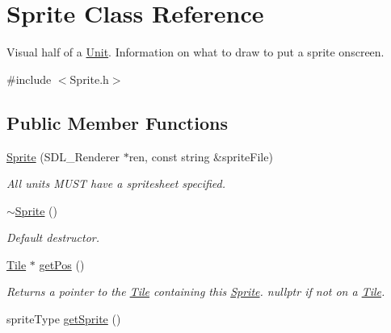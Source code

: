 \hypertarget{class_sprite}{}\section{Sprite Class Reference}
\label{class_sprite}


Visual half of a \hyperlink{class_unit}{Unit}. Information on what to draw to put a sprite onscreen.  




{\ttfamily \#include $<$Sprite.\+h$>$}

\subsection*{Public Member Functions}
\begin{DoxyCompactItemize}
\item 
\hyperlink{class_sprite_aae9fc5691e7263139e9e8d1d969cba5c}{Sprite} (S\+D\+L\+\_\+\+Renderer $\ast$ren, const string \&sprite\+File)\hypertarget{class_sprite_aae9fc5691e7263139e9e8d1d969cba5c}{}\label{class_sprite_aae9fc5691e7263139e9e8d1d969cba5c}

\begin{DoxyCompactList}\small\item\em All units M\+U\+ST have a spritesheet specified. \end{DoxyCompactList}\item 
\hyperlink{class_sprite_a8accab430f9d90ae5117b57d67e32b84}{$\sim$\+Sprite} ()\hypertarget{class_sprite_a8accab430f9d90ae5117b57d67e32b84}{}\label{class_sprite_a8accab430f9d90ae5117b57d67e32b84}

\begin{DoxyCompactList}\small\item\em Default destructor. \end{DoxyCompactList}\item 
\hyperlink{class_tile}{Tile} $\ast$ \hyperlink{class_sprite_a6c4961079fab937172061be32d654e85}{get\+Pos} ()\hypertarget{class_sprite_a6c4961079fab937172061be32d654e85}{}\label{class_sprite_a6c4961079fab937172061be32d654e85}

\begin{DoxyCompactList}\small\item\em Returns a pointer to the \hyperlink{class_tile}{Tile} containing this \hyperlink{class_sprite}{Sprite}. nullptr if not on a \hyperlink{class_tile}{Tile}. \end{DoxyCompactList}\item 
sprite\+Type \hyperlink{class_sprite_a01742e39c9f18622a094a187d6858912}{get\+Sprite} ()\hypertarget{class_sprite_a01742e39c9f18622a094a187d6858912}{}\label{class_sprite_a01742e39c9f18622a094a187d6858912}


\end{DoxyCompactItemize}
